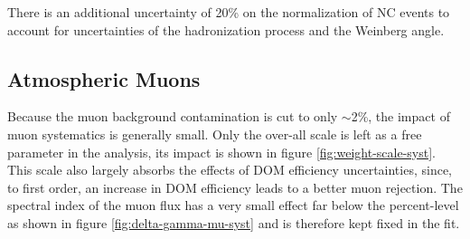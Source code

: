 There is an additional uncertainty of 20\% on the normalization of NC events to account for uncertainties of the hadronization process and the Weinberg angle.

\subsection{Atmospheric Muons}

Because the muon background contamination is cut to only $\sim$2\%, the impact of muon systematics is generally small. Only the over-all scale is left as a free parameter in the analysis, its impact is shown in figure \ref{fig:weight-scale-syst}. This scale also largely absorbs the effects of DOM efficiency uncertainties, since, to first order, an increase in DOM efficiency leads to a better muon rejection. The spectral index of the muon flux has a very small effect far below the percent-level as shown in figure \ref{fig:delta-gamma-mu-syst} and is therefore kept fixed in the fit.

